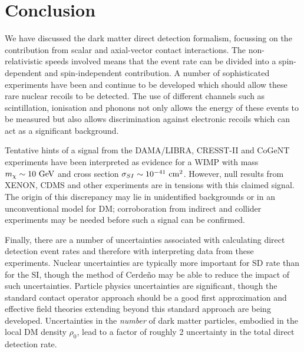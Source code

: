 

\section{Conclusion}

We have discussed the dark matter direct detection formalism, focussing on the contribution from scalar and axial-vector contact interactions. The non-relativistic speeds involved means that the event rate can be divided into a spin-dependent and spin-independent contribution. A number of sophisticated experiments have been and continue to be developed which should allow these rare nuclear recoils to be detected. The use of different channels such as scintillation, ionisation and phonons not only allows the energy of these events to be measured but also allows discrimination against electronic recoils which can act as a significant background.

Tentative hints of a signal from the DAMA/LIBRA, CRESST-II and CoGeNT experiments have been interpreted as evidence for a WIMP with mass $m_\chi \sim 10 \textrm{ GeV}$ and cross section $\sigma_{SI} \sim 10^{-41} \textrm{ cm}^2$. However, null results from XENON, CDMS and other experiments are in tensions with this claimed signal. The origin of this discrepancy may lie in unidentified backgrounds or in an unconventional model for DM; corroboration from indirect and collider experiments may be needed before such a signal can be confirmed. 

Finally, there are a number of uncertainties associated with calculating direct detection event rates and therefore with interpreting data from these experiments. Nuclear uncertainties are typically more important for SD rate than for the SI, though the method of Cerde\~{n}o \etal may be able to reduce the impact of such uncertainties. Particle physics uncertainties are significant, though the standard contact operator approach should be a good first approximation and effective field theories extending beyond this standard approach are being developed. Uncertainties in the \textit{number} of dark matter particles, embodied in the local DM density $\rho_0$, lead to a factor of roughly 2 uncertainty in the total direct detection rate. 

